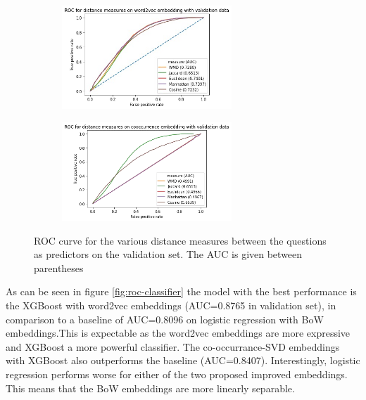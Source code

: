 \documentclass[11pt,a4paper]{article}
\begin{document}
\begin{figure}[h]
    \centering
    \begin{subfigure}[b]{\textwidth}
        \centering
         \includegraphics[width=0.7\textwidth]{img/roc_dist_w2v}
    \end{subfigure}
    \hfill
    \begin{subfigure}[b]{\textwidth}
        \centering
         \includegraphics[width=0.7\textwidth]{img/roc_dist_cooccurrence}
    \end{subfigure}
    \caption{ROC curve for the various distance measures between the questions as predictors on the validation set. The AUC is given between parentheses}
    \label{fig:roc}
\end{figure}

As can be seen in figure \ref{fig:roc-classifier} the model with the best performance is the XGBoost with word2vec embeddings (AUC=0.8765 in validation set), in comparison to a baseline of AUC=0.8096 on logistic regression with BoW embeddings.This is expectable as the word2vec embeddings are more expressive and XGBoost a more powerful classifier. The co-occurrance-SVD embeddings with XGBoost also outperforms the baseline (AUC=0.8407). Interestingly, logistic regression performs worse for either of the two proposed improved embeddings. This means that the BoW embeddings are more linearly separable.
\end{document}
